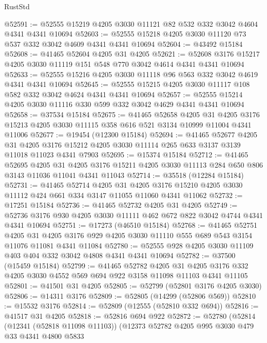 \begin{lexlean}{RustStd}
\begin{coremodule}
@52591 := @52555 @15219 @4205 @3030 @11121 @82 @532 @332 @3042 @4604 @4341 @4341 @10694
@52603 := @52555 @15218 @4205 @3030 @11120 @73 @537 @332 @3042 @4609 @4341 @4341 @10694
@52604 := @43492 @15184
@52608 := @41465 @52604 @4205 @31 @4205
@52621 := @52608 @3176 @15217 @4205 @3030 @11119 @151 @548 @770 @3042 @4614 @4341 @4341 @10694
@52633 := @52555 @15216 @4205 @3030 @11118 @96 @563 @332 @3042 @4619 @4341 @4341 @10694
@52645 := @52555 @15215 @4205 @3030 @11117 @108 @582 @332 @3042 @4624 @4341 @4341 @10694
@52657 := @52555 @15214 @4205 @3030 @11116 @330 @599 @332 @3042 @4629 @4341 @4341 @10694
@52658 := @37534 @15184
@52675 := @41465
    @52658
    @4205
    @31
    @4205
    @3176
    @15213
    @4205
    @3030
    @11115
    @358
    @616
    @521
    @3134
    @10999
    @11004
    @4341
    @11006
@52677 := @19454 (@12300 @15184)
@52694 := @41465
    @52677
    @4205
    @31
    @4205
    @3176
    @15212
    @4205
    @3030
    @11114
    @265
    @633
    @3137
    @3139
    @11018
    @11023
    @4341
    @7903
@52695 := @15374 @15184
@52712 := @41465
    @52695
    @4205
    @31
    @4205
    @3176
    @15211
    @4205
    @3030
    @11113
    @284
    @650
    @806
    @3143
    @11036
    @11041
    @4341
    @11043
@52714 := @35518 (@12284 @15184)
@52731 := @41465
    @52714
    @4205
    @31
    @4205
    @3176
    @15210
    @4205
    @3030
    @11112
    @424
    @661
    @334
    @3147
    @11055
    @11060
    @4341
    @11062
@52732 := @17251 @15184
@52736 := @41465 @52732 @4205 @31 @4205
@52749 := @52736 @3176 @930 @4205 @3030 @11111 @462 @672 @822 @3042 @4744 @4341 @4341 @10694
@52751 := @17273 (@46510 @15184)
@52768 := @41465
    @52751
    @4205
    @31
    @4205
    @3176
    @929
    @4205
    @3030
    @11110
    @555
    @689
    @543
    @3154
    @11076
    @11081
    @4341
    @11084
@52780 := @52555 @928 @4205 @3030 @11109 @403 @404 @332 @3042 @4808 @4341 @4341 @10694
@52782 := @37500 (@15459 @15184)
@52799 := @41465
    @52782
    @4205
    @31
    @4205
    @3176
    @332
    @4205
    @3030
    @4552
    @569
    @694
    @922
    @3158
    @11098
    @11103
    @4341
    @11105
@52801 := @41501 @31 @4205
@52805 := @52799 (@52801 @3176 @4205 @3030)
@52806 := @14311 @3176
@52809 := @52805 (@14299 (@52806 @569))
@52810 := @15532 @3176
@52814 := @52809 (@12555 (@52810 @332 @694))
@52816 := @41517 @31 @4205
@52818 := @52816 @694 @922
@52872 := @52780
    (@52814
      (@12341 (@52818 @11098 @11103))
      (@12373
        @52782
        @4205
        @995
        @3030
        @479
        @33
        @4341
        @4800
        @5833

\end{coremodule}
\end{lexlean}
